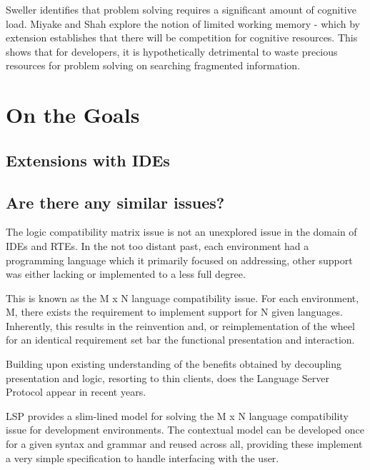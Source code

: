 Sweller \parencite*{sweller1998cognitive} identifies that problem solving requires a significant amount of cognitive load. Miyake and Shah \parencite*{miyake1999models} explore the notion of limited working memory - which by extension establishes that there will be competition for cognitive resources. This shows that for developers, it is hypothetically detrimental to waste precious resources for problem solving on searching fragmented information.


\section{On the Goals}

\subsection{Extensions with IDEs}


\subsection{Are there any similar issues?}

The logic compatibility matrix issue is not an unexplored issue in the domain of IDEs and RTEs. In the not too distant past, each environment had a programming language which it primarily focused on addressing, other support was either lacking or implemented to a less full degree. 

This is known as the M x N language compatibility issue. For each environment, M, there exists the requirement to implement support for N given languages. Inherently, this results in the reinvention and, or reimplementation of the wheel for an identical requirement set bar the functional presentation and interaction.

Building upon existing understanding of the benefits obtained by decoupling presentation and logic, resorting to thin clients, does the Language Server Protocol \parencite{lspGitHubSiteMSFT} appear in recent years.

LSP provides a slim-lined model for solving the M x N language compatibility issue for development environments. The contextual model can be developed once for a given syntax and grammar and reused across all, providing these implement a very simple specification to handle interfacing with the user.

